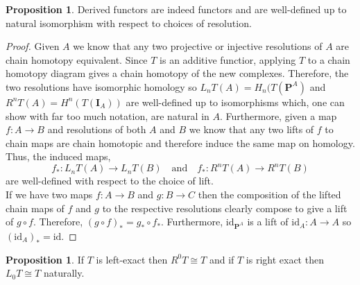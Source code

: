 \documentclass[12pt]{article}
\newcommand{\id}{\mathrm{id}}
\theoremstyle{remark}
\theoremstyle{definition}
\newtheorem{proposition}[theorem]{Proposition}
\begin{document}
\begin{proposition}
Derived functors are indeed functors and are well-defined up to natural isomorphism with respect to choices of resolution. 
\end{proposition}

\begin{proof}
Given $A$ we know that any two projective or injective resolutions of $A$ are chain homotopy equivalent. Since $T$ is an additive functior, applying $T$ to a chain homotopy diagram gives a chain homotopy of the new complexes. Therefore, the two resolutions have isomorphic homology so $L_n T(A) = H_n(T(\mathbf{P}^A)$ and $R^n T(A) = H^n(T(\mathbf{I}_A))$ are well-defined up to isomorphisms which, one can show with far too much notation, are natural in $A$. Furthermore, given a map $f : A \to B$ and resolutions of both $A$ and $B$ we know that any two lifts of $f$ to chain maps are chain homotopic and therefore induce the same map on homology. Thus, the induced maps,
\[ 
f_* : L_n T(A) \to L_n T (B) \quad \text{and} \quad f_* : R^n T(A) \to R^n T(B) 
\]
are well-defined with respect to the choice of lift. 
\bigskip\\
If we have two maps $f : A \to B$ and $g : B \to C$ then the composition of the lifted chain maps of $f$ and $g$ to the respective resolutions clearly compose to give a lift of $g \circ f$. Therefore, $(g \circ f)_* = g_* \circ f_*$. Furthermore, $\id_{\mathbf{P}^A}$ is a lift of $\id_{A} : A \to A$ so $(\id_A)_* = \id$. 
\end{proof}

\begin{proposition}
If $T$ is left-exact then $R^0 T \cong T$ and if $T$ is right exact then $L_0 T \cong T$ naturally. 
\end{proposition}
\end{document}
